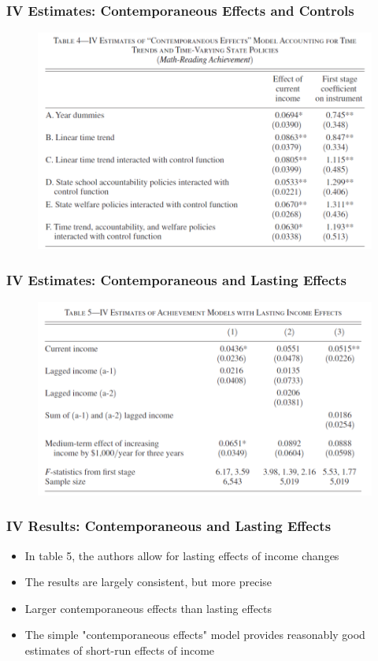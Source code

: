 \documentclass{beamer}
\begin{document}
\begin{frame}
\frametitle{IV Estimates: Contemporaneous Effects and Controls}
\begin{figure}
	\includegraphics[scale=0.4]{../Tables/table3.png} %
\end{figure}
\end{frame}

\begin{frame}
\frametitle{IV Estimates: Contemporaneous and Lasting Effects}
\begin{figure}
	\includegraphics[scale=0.4]{../Tables/table4.png} %
\end{figure}
\end{frame}

\begin{frame}
\frametitle{IV Results: Contemporaneous and Lasting Effects}
\begin{itemize}
	\item In table 5, the authors allow for lasting effects of income changes
	\item The results are largely consistent, but more precise
	\item Larger contemporaneous effects than lasting effects
	\item The simple "contemporaneous effects" model provides reasonably good estimates of short-run effects of income
\end{itemize}
\end{frame}
\end{document}
